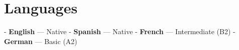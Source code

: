 \section{Languages}

- \textbf{English} — Native
- \textbf{Spanish} — Native
- \textbf{French} — Intermediate (B2)
- \textbf{German} — Basic (A2)

